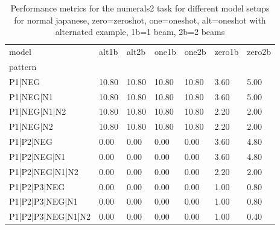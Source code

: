 \begin{table}[h]
\begin{tabular}{l|llllll}
\toprule
model & alt1b & alt2b & one1b & one2b & zero1b & zero2b \\
pattern &  &  &  &  &  &  \\
\midrule
P1|NEG & 10.80 & 10.80 & 10.80 & 10.80 & 3.60 & 5.00 \\
P1|NEG|N1 & 10.80 & 10.80 & 10.80 & 10.80 & 3.60 & 5.00 \\
P1|NEG|N1|N2 & 10.80 & 10.80 & 10.80 & 10.80 & 2.20 & 2.00 \\
P1|NEG|N2 & 10.80 & 10.80 & 10.80 & 10.80 & 2.20 & 2.00 \\
P1|P2|NEG & 0.00 & 0.00 & 0.00 & 0.00 & 3.60 & 4.80 \\
P1|P2|NEG|N1 & 0.00 & 0.00 & 0.00 & 0.00 & 3.60 & 4.80 \\
P1|P2|NEG|N1|N2 & 0.00 & 0.00 & 0.00 & 0.00 & 2.20 & 2.00 \\
P1|P2|P3|NEG & 0.00 & 0.00 & 0.00 & 0.00 & 1.00 & 0.80 \\
P1|P2|P3|NEG|N1 & 0.00 & 0.00 & 0.00 & 0.00 & 1.00 & 0.80 \\
P1|P2|P3|NEG|N1|N2 & 0.00 & 0.00 & 0.00 & 0.00 & 1.00 & 0.40 \\
\bottomrule
\end{tabular}
\caption{Performance metrics for the numerals2 task for different model setups for normal japanese, zero=zeroshot, one=oneshot, alt=oneshot with alternated example, 1b=1 beam, 2b=2 beams}
\label{tab:ja norm_numerals2_performance}
\end{table}
